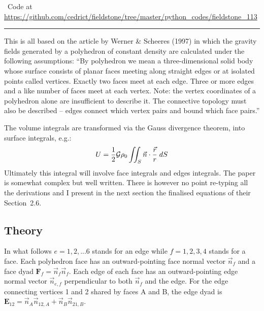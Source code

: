 

\begin{center}
\inpython~Code at \url{https://github.com/cedrict/fieldstone/tree/master/python_codes/fieldstone_113}
\end{center}

\par\noindent\rule{\textwidth}{0.4pt}



This is all based on the article by Werner \& Scheeres (1997) \cite{wesc97} in which 
the gravity fields generated by a polyhedron 
of constant density are calculated under the following assumptions:
``By polyhedron we mean a three-dimensional solid body whose surface consists of planar faces 
meeting along straight edges or at isolated points called vertices. Exactly two faces meet 
at each edge. Three or more edges and a like number of faces meet at each vertex. Note: 
the vertex coordinates of a polyhedron alone are insufficient to describe it. The connective 
topology must also be described -- edges connect which vertex pairs and bound which face pairs.''

The volume integrals are transformed via the Gauss divergence theorem, into surface integrals, e.g.:
\[
U = \frac12 {\cal G} \rho_0 \iint_S \vec{n} \cdot \frac{\vec{r}}{r} \; dS
\]
Ultimately this integral will involve face integrals and edges integrals.
The paper is somewhat complex but well written. There is however no point re-typing all the derivations and I present in the next section the finalised equations of their Section~2.6.


\subsection*{Theory}


In what follows $e=1,2,...6$ stands for an edge while $f=1,2,3,4$ stands
for a face. 
Each polyhedron face has an outward-pointing face normal vector $\vec{n}_f$
and a face dyad ${\bm F}_f =\vec{n}_f\vec{n}_f $.
Each edge of each face has an outward-pointing edge normal
vector $\vec{n}_{e,f}$ perpendicular to both $\vec{n}_f$ and the edge.
For the edge connecting vertices 1 and 2 shared by faces A and B,
the edge dyad is ${\bm E}_{12}=\vec{n}_A \vec{n}_{12,A}+\vec{n}_B \vec{n}_{21,B}$.

